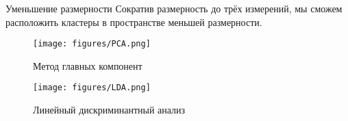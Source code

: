 \documentclass{beamer}
\begin{document}
\begin{frame}{Уменьшение размерности}
    Сократив размерность до трёх измерений, мы сможем расположить кластеры в пространстве меньшей размерности.
    \begin{minipage}[b]{0.45\linewidth}
        \centering
        \begin{figure}
            \texttt{[image: figures/PCA.png]}
            \caption{\scriptsize Метод главных компонент}
            \label{fig:f_s_tag}
        \end{figure}
    \end{minipage}
    \begin{minipage}[b]{0.45\linewidth}
        \centering
        \begin{figure}
            \texttt{[image: figures/LDA.png]}
            \caption{\tiny Линейный дискриминантный анализ}
            \label{fig:f_s_tag}            
        \end{figure}
    \end{minipage}
\end{frame}

\end{document}
